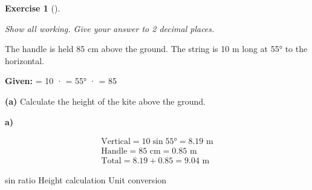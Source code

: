 \documentclass[
  letterpaper,
  DIV=11,
  numbers=noendperiod]{scrreprt}
\theoremstyle{definition}
\newtheorem{exercise}{Exercise}[chapter]
\theoremstyle{remark}
\begin{document}
\begin{exercise}[]\protect\hypertarget{exr-trig-21}{}\label{exr-trig-21}

\emph{Show all working. Give your answer to 2 decimal places.}

The handle is held 85 cm above the ground. The string is 10 m long at
55° to the horizontal.

\textbf{Given:}  = 10 ·  = 55° ·
 = 85

\textbf{(a)} Calculate the height of the kite above the ground.

\begin{tcolorbox}[enhanced jigsaw, opacitybacktitle=0.6, coltitle=black, arc=.35mm, colframe=quarto-callout-tip-color-frame, colback=white, bottomrule=.15mm, left=2mm, colbacktitle=quarto-callout-tip-color!10!white, titlerule=0mm, opacityback=0, title=\textcolor{quarto-callout-tip-color}{\faLightbulb}\hspace{0.5em}{🔍 View Solution}, leftrule=.75mm, breakable, rightrule=.15mm, bottomtitle=1mm, toptitle=1mm, toprule=.15mm]

\textbf{a)}

\[
\begin{aligned}
\text{Vertical} = 10 \sin 55° = 8.19 \text{ m} \\ \text{Handle} = 85 \text{ cm} = 0.85 \text{ m} \\ \text{Total} = 8.19 + 0.85 = 9.04 \text{ m}
\end{aligned}
\]

\end{tcolorbox}

{sin ratio} {Height calculation} {Unit conversion}

\end{exercise}
\end{document}

